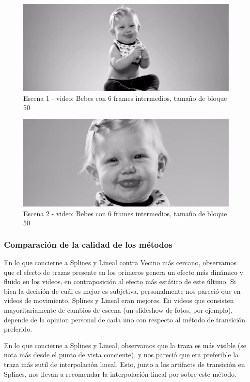 \FloatBarrier
\begin{figure}[h]
\caption{Escena 1 - video: Bebes con 6 frames intermedios, tama\~no de bloque 50}
\label{BebesSplinesS1}
\includegraphics[width=0.9\columnwidth]{imagenes/cualitativos/BSS1.png}
\end{figure}
\FloatBarrier

\FloatBarrier
\begin{figure}[h]
\caption{Escena 2 - video: Bebes con 6 frames intermedios, tama\~no de bloque 50}
\label{BebesSplinesS2}
\includegraphics[width=0.9\columnwidth]{imagenes/cualitativos/BSS2.png}
\end{figure}
\FloatBarrier

\subsubsection{Comparaci\'on de la calidad de los m\'etodos}
\par En lo que concierne a Splines y Lineal contra Vecino m\'as cercano, observamos que el efecto de trazas presente en los primeros genera un efecto m\'as din\'amico y fluido en los videos, en contraposici\'on al efecto m\'as est\'atico de este \'ultimo.
Si bien la decisi\'on de cu\'al es mejor es subjetiva, personalmente nos pareci\'o que en videos de movimiento, Splines y Lineal eran mejores.
En videos que consisten mayoritariamente de cambios de escena (un slideshow de fotos, por ejemplo), depende de la opinion personal de cada uno con respecto al m\'etodo de transici\'on preferido.
\par En lo que concierne a Splines y Lineal, observamos que la traza es m\'as visible (se nota m\'as desde el punto de vista conciente), y nos pareci\'o que era preferible la traza m\'as sutil de interpolaci\'on lineal.
Esto, junto a los artifacts de transici\'on en Splines, nos llevan a recomendar la interpolaci\'on lineal por sobre este m\'etodo.
